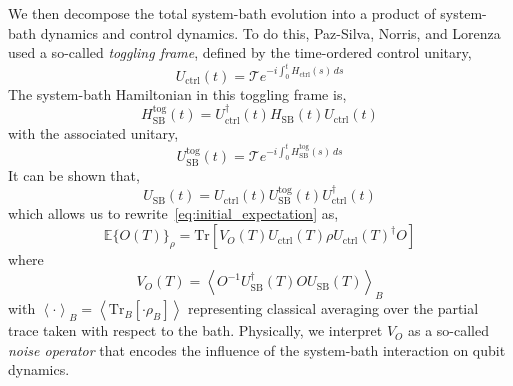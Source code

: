 \documentclass[12pt]{iopart}
\begin{document}
We then decompose the total system-bath evolution into a product of system-bath dynamics and control dynamics. To do this, Paz-Silva, Norris, and Lorenza~\cite{paz2017multiqubit} used a so-called \textit{toggling frame}, defined by the time-ordered control unitary,
\begin{equation} \label{eq:control_unitary_construction}
    U_{\mathrm{ctrl}}(t)=\mathcal{T} e^{-i \int_0^t H_{\mathrm{ctrl}}(s) \, ds}
\end{equation}
The system-bath Hamiltonian in this toggling frame is,
\begin{equation}\label{eq:interaction_hamiltonian}
    H_{\mathrm{SB}}^{\mathrm{tog}}(t) = U_{\mathrm{ctrl}}^{\dagger}(t) H_{\mathrm{SB}}(t) U_{\mathrm{ctrl}}(t)
\end{equation}
with the associated unitary,
\begin{equation}\label{eq:interaction_unitary}
    U_{\mathrm{SB}}^{\mathrm{tog}}(t)=\mathcal{T} e^{-i \int_0^t H_{\mathrm{SB}}^{\mathrm{tog}}(s) \, ds}
\end{equation}
It can be shown that,
\begin{equation}\label{eq:final_interaction_unitary}
    {U}_{\mathrm{SB}}(t)=U_{\mathrm{ctrl}}(t)  U_{\mathrm{SB}}^{\mathrm{tog}}(t) U_{\mathrm{ctrl}}^{\dagger}(t)
\end{equation}
which allows us to rewrite~\cref{eq:initial_expectation} as,
\begin{equation} \label{eq:expectation_with_noise}
    \mathbb{E}\{O(T)\}_\rho=\mathrm{Tr}\left[V_O(T) U_{\mathrm{ctrl}}(T) \rho U_{\mathrm{ctrl}}(T)^{\dagger} O\right]
\end{equation}
where
\begin{equation} \label{eq:VO_construction}
    V_{O}(T)=\left\langle O^{-1} {U}_{\mathrm{SB}}^{\dagger}(T) O {U}_{\mathrm{SB}}(T)\right\rangle_{B}
\end{equation}
with $\left\langle \cdot \right\rangle_{B}=\left\langle\mathrm{Tr}_{B}\left[\cdot \rho_{B}\right]\right\rangle$ representing classical averaging over the partial trace taken with respect to the bath. Physically, we interpret $V_{O}$ as a so-called \textit{noise operator} that encodes the influence of the system-bath interaction on qubit dynamics.
\end{document}
